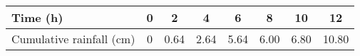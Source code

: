 \noindent
\begin{tabular}{|l|c|c|c|c|c|c|c|}
\hline
Time (h) & 0 & 2 & 4 & 6 & 8 & 10 & 12 \\ \hline
Cumulative rainfall (cm) & 0 & 0.64 & 2.64 & 5.64 & 6.00 & 6.80 & 10.80 \\ \hline
\end{tabular}
